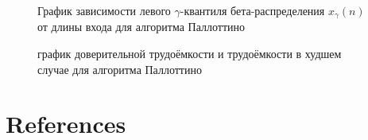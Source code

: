 \documentclass[a4paper]{article}
\begin{document}
\begin{figure}[!]
	\caption{График зависимости левого $\gamma$-квантиля бета-распределения $x_\gamma(n)$ от длины входа для алгоритма Паллоттино}
	\label{image5}
\end{figure}

\begin{figure}[!]
	\caption{график доверительной трудоёмкости и трудоёмкости в худшем случае для алгоритма Паллоттино}
	\label{image6}
\end{figure}

\newpage

\section{References} \label{sec:sources}
\end{document}

